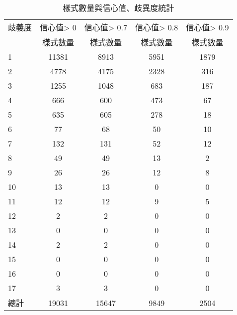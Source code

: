 \begin{table}[t]
    \begin{center}
        \small
        \begin{tabular}{l||c|c|c|c}
        \hline
        歧義度 & 信心值> 0 & 信心值> 0.7 & 信心值> 0.8 & 信心值> 0.9\\
          & 樣式數量 & 樣式數量 & 樣式數量 & 樣式數量 \\
        \hline
        1 & 11381 & 8913 & 5951 & 1879 \\
        2 & 4778 & 4175 & 2328 & 316 \\
        3 & 1255 & 1048 & 683 & 187 \\
        4 & 666 & 600 & 473 & 67 \\
        5 & 635 & 605 & 278 & 18 \\
        6 & 77 & 68 & 50 & 10 \\
        7 & 132 & 131 & 52 & 12 \\
        8 & 49 & 49 & 13 & 2 \\
        9 & 26 & 26 & 12 & 8 \\
        10 & 13 & 13 & 0 & 0 \\
        11 & 12 & 12 & 9 & 5 \\
        12 & 2 & 2 & 0 & 0 \\
        13 & 0 & 0 & 0 & 0 \\
        14 & 2 & 2 & 0 & 0 \\
        15 & 0 & 0 & 0 & 0 \\
        16 & 0 & 0 & 0 & 0 \\
        17 & 3 & 3 & 0 & 0 \\
        \hline
        總計 & 19031 & 15647 & 9849 & 2504 \\
        \hline
        \end{tabular}
        \caption{樣式數量與信心值、歧異度統計}
        \label{t:yago-degree}
    \end{center}
\end{table}
